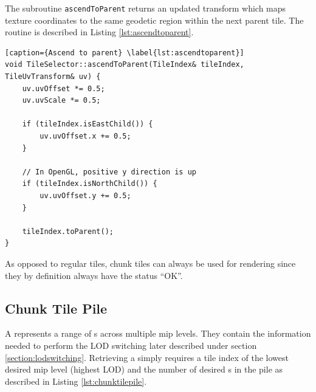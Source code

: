  
The subroutine \texttt{ascendToParent} returns an updated transform which maps texture coordinates to the same geodetic region within the next parent tile. The routine is described in Listing \ref{lst:ascendtoparent}.

\begin{lstlisting}[caption={Ascend to parent} \label{lst:ascendtoparent}]
void TileSelector::ascendToParent(TileIndex& tileIndex, TileUvTransform& uv) {
    uv.uvOffset *= 0.5;
    uv.uvScale *= 0.5;

    if (tileIndex.isEastChild()) {
        uv.uvOffset.x += 0.5;
    }

    // In OpenGL, positive y direction is up
    if (tileIndex.isNorthChild()) {
        uv.uvOffset.y += 0.5;
    }

    tileIndex.toParent();
}
\end{lstlisting}

As opposed to regular tiles, chunk tiles can always be used for rendering since they by definition always have the status ``OK''.

\subsection{Chunk Tile Pile}
\label{section:chunktilepile}

A  represents a range of s across multiple mip levels. They contain the information needed to perform the LOD switching later described under section \ref{section:lodswitching}. Retrieving a  simply requires a tile index of the lowest desired mip level (highest LOD) and the number of desired s in the pile as described in Listing \ref{lst:chunktilepile}.

